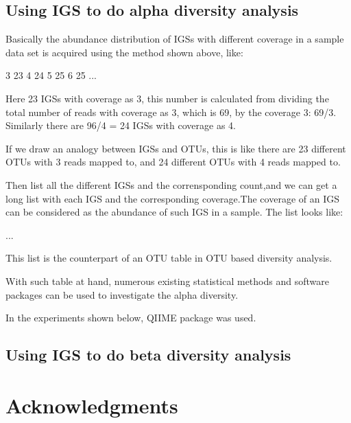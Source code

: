 \documentclass{article}
\begin{document}


\subsection{Using IGS to do alpha diversity analysis}


Basically the abundance distribution of IGSs with different coverage in a sample data set is acquired using the method shown above, like:

    3 23
    4 24
    5 25
    6 25
    ...

Here 23 IGSs with coverage as 3, this number is calculated from dividing the total number of reads with coverage as 3, which is 69, by the coverage 3: 69/3. Similarly there are 96/4 = 24 IGSs with coverage as 4.

If we draw an analogy between IGSs and OTUs, this is like there are 23 different OTUs with 3 reads mapped to, and 24 different OTUs with 4 reads mapped to. 

Then list all the different IGSs and the corrensponding count,and we can get a long list with each IGS and the corresponding coverage.The coverage of an IGS can be considered as the abundance of such IGS in a sample. The list looks like:

    ...
  
This list is the counterpart of an OTU table in OTU based diversity analysis.

With such table at hand, numerous existing statistical methods and software packages can be used to investigate the alpha diversity.  

In the experiments shown below, QIIME package was used. 



\subsection{Using IGS to do beta diversity analysis}


\section{Acknowledgments}
\end{document}
